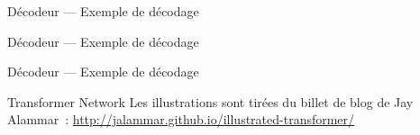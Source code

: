 \begin{frame}{Décodeur --- Exemple de décodage}
\end{frame}

\begin{frame}{Décodeur --- Exemple de décodage}
\end{frame}

\begin{frame}{Décodeur --- Exemple de décodage}
\end{frame}

\begin{frame}{Transformer Network}
  Les illustrations sont tirées du billet de blog de Jay Alammar~:
  \url{http://jalammar.github.io/illustrated-transformer/}
\end{frame}
